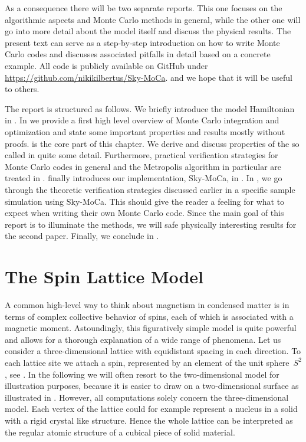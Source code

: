 As a consequence there will be two separate reports. This one focuses on the
algorithmic aspects and Monte Carlo methods in general, while the other one will
go into more detail about the model itself and discuss the physical results. The
present text can serve as a step-by-step introduction on how to write Monte
Carlo codes and discusses associated pitfalls in detail based on a concrete
example. All code is publicly available on GitHub under
\href{https://github.com/nikikilbertus/Sky-MoCa}{https://github.com/nikikilbertus/Sky-MoCa}.
and we hope that it will be useful to others.

The report is structured as follows. We briefly introduce the model Hamiltonian
in . In  we provide a first high level
overview of Monte Carlo integration and optimization and state some important
properties and results mostly without proofs.  is the
core part of this chapter. We derive and discuss properties of the so called
 in quite some detail. Furthermore, practical
verification strategies for Monte Carlo codes in general and the Metropolis
algorithm in particular are treated in . 
finally introduces our implementation, Sky-MoCa, in . In
, we go through the theoretic verification strategies
discussed earlier in a specific sample simulation using Sky-MoCa. This should
give the reader a feeling for what to expect when writing their own Monte Carlo
code. Since the main goal of this report is to illuminate the methods, we will
safe physically interesting results for the second paper. Finally, we conclude
in .
%
\section{The Spin Lattice Model}\label{sec:model}
%
A common high-level way to think about magnetism in condensed matter is in terms
of complex collective behavior of spins, each of which is associated with a
magnetic moment. Astoundingly, this figuratively simple model is quite powerful
and allows for a thorough explanation of a wide range of phenomena. Let us
consider a three-dimensional lattice with equidistant spacing in each direction.
To each lattice site we attach a spin, represented by an element of the unit
sphere~$S^2$, see . In the following we will often resort to the
two-dimensional model for illustration purposes, because it is easier to draw on
a two-dimensional surface as illustrated in . However, all
computations solely concern the three-dimensional model. Each vertex of the
lattice could for example represent a nucleus in a solid with a rigid crystal
like structure. Hence the whole lattice can be interpreted as the regular atomic
structure of a cubical piece of solid material.

